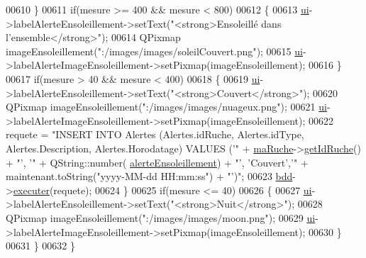 \begin{DoxyCode}
00610         \}
00611         \textcolor{keywordflow}{if}(mesure >= 400 && mesure < 800)
00612         \{
00613             \hyperlink{class_ruche_ihm_a64786058bd7f88ca2f1e9743bb27c25b}{ui}->labelAlerteEnsoleillement->setText(\textcolor{stringliteral}{"<strong>Ensoleillé dans l'ensemble</strong>"});
00614             QPixmap imageEnsoleillement(\textcolor{stringliteral}{":/images/images/soleilCouvert.png"});
00615             \hyperlink{class_ruche_ihm_a64786058bd7f88ca2f1e9743bb27c25b}{ui}->labelAlerteImageEnsoleillement->setPixmap(imageEnsoleillement);
00616         \}
00617         \textcolor{keywordflow}{if}(mesure > 40 && mesure < 400)
00618         \{
00619             \hyperlink{class_ruche_ihm_a64786058bd7f88ca2f1e9743bb27c25b}{ui}->labelAlerteEnsoleillement->setText(\textcolor{stringliteral}{"<strong>Couvert</strong>"});
00620             QPixmap imageEnsoleillement(\textcolor{stringliteral}{":/images/images/nuageux.png"});
00621             \hyperlink{class_ruche_ihm_a64786058bd7f88ca2f1e9743bb27c25b}{ui}->labelAlerteImageEnsoleillement->setPixmap(imageEnsoleillement);
00622             requete = \textcolor{stringliteral}{"INSERT INTO Alertes (Alertes.idRuche, Alertes.idType, Alertes.Description,
       Alertes.Horodatage) VALUES ('"} + \hyperlink{class_ruche_ihm_a43a6b1fa31f4fba58d919daae3707b38}{maRuche}->\hyperlink{class_ruche_a9f2de5ef29557ec7a53d5e22df34d164}{getIdRuche}() + \textcolor{stringliteral}{"', '"} + QString::number(
      \hyperlink{parametres_8h_a83a725fd153179a2bd97afcc8307737ba256a82c8886c1902dc7a078868434f83}{alerteEnsoleillement}) + \textcolor{stringliteral}{"', 'Couvert','"} + maintenant.toString(\textcolor{stringliteral}{"yyyy-MM-dd  HH:mm:ss"}) 
      + \textcolor{stringliteral}{"')"};
00623             \hyperlink{class_ruche_ihm_a0851936fe212e8d40538264f09749153}{bdd}->\hyperlink{class_base_de_donnees_aa8de5f8f8bb17edc43f5c0ee33712081}{executer}(requete);
00624         \}
00625         \textcolor{keywordflow}{if}(mesure <= 40)
00626         \{
00627             \hyperlink{class_ruche_ihm_a64786058bd7f88ca2f1e9743bb27c25b}{ui}->labelAlerteEnsoleillement->setText(\textcolor{stringliteral}{"<strong>Nuit</strong>"});
00628             QPixmap imageEnsoleillement(\textcolor{stringliteral}{":/images/images/moon.png"});
00629             \hyperlink{class_ruche_ihm_a64786058bd7f88ca2f1e9743bb27c25b}{ui}->labelAlerteImageEnsoleillement->setPixmap(imageEnsoleillement);
00630         \}
00631     \}
00632 \}
\end{DoxyCode}
\mbox{\label{class_ruche_ihm_a76b73e39e55443fc7b9bb773eac3321f}} 
